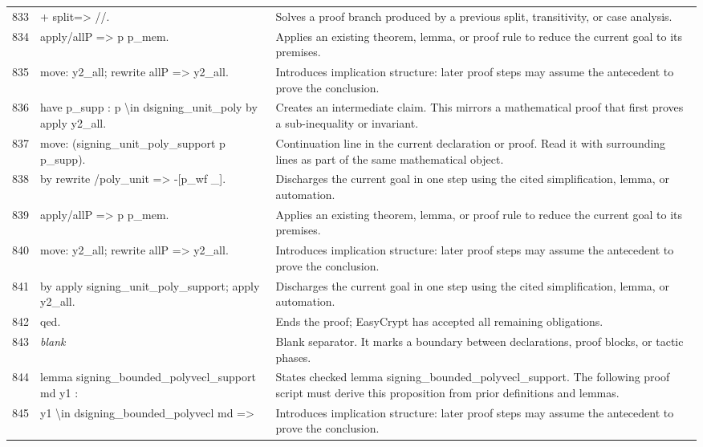 \documentclass[10pt]{article}
\begin{document}
\begin{longtable}{r L{0.53\textwidth} L{0.37\textwidth}}
833 & {\ttfamily\scriptsize + split=> //.} & Solves a proof branch produced by a previous split, transitivity, or case analysis. \\
834 & {\ttfamily\scriptsize   apply/allP => p p\_mem.} & Applies an existing theorem, lemma, or proof rule to reduce the current goal to its premises. \\
835 & {\ttfamily\scriptsize   move: y2\_all; rewrite allP => y2\_all.} & Introduces implication structure: later proof steps may assume the antecedent to prove the conclusion. \\
836 & {\ttfamily\scriptsize   have p\_supp : p \textbackslash{}in dsigning\_unit\_poly by apply y2\_all.} & Creates an intermediate claim.  This mirrors a mathematical proof that first proves a sub-inequality or invariant. \\
837 & {\ttfamily\scriptsize   move: (signing\_unit\_poly\_support p p\_supp).} & Continuation line in the current declaration or proof.  Read it with surrounding lines as part of the same mathematical object. \\
838 & {\ttfamily\scriptsize   by rewrite /poly\_unit => -[p\_wf \_].} & Discharges the current goal in one step using the cited simplification, lemma, or automation. \\
839 & {\ttfamily\scriptsize apply/allP => p p\_mem.} & Applies an existing theorem, lemma, or proof rule to reduce the current goal to its premises. \\
840 & {\ttfamily\scriptsize move: y2\_all; rewrite allP => y2\_all.} & Introduces implication structure: later proof steps may assume the antecedent to prove the conclusion. \\
841 & {\ttfamily\scriptsize by apply signing\_unit\_poly\_support; apply y2\_all.} & Discharges the current goal in one step using the cited simplification, lemma, or automation. \\
842 & {\ttfamily\scriptsize qed.} & Ends the proof; EasyCrypt has accepted all remaining obligations. \\
843 & {\ttfamily\scriptsize \emph{blank}} & Blank separator.  It marks a boundary between declarations, proof blocks, or tactic phases. \\
844 & {\ttfamily\scriptsize lemma signing\_bounded\_polyvecl\_support md y1 :} & States checked lemma signing\_bounded\_polyvecl\_support.  The following proof script must derive this proposition from prior definitions and lemmas. \\
845 & {\ttfamily\scriptsize   y1 \textbackslash{}in dsigning\_bounded\_polyvecl md =>} & Introduces implication structure: later proof steps may assume the antecedent to prove the conclusion. \\

\end{longtable}
\end{document}
